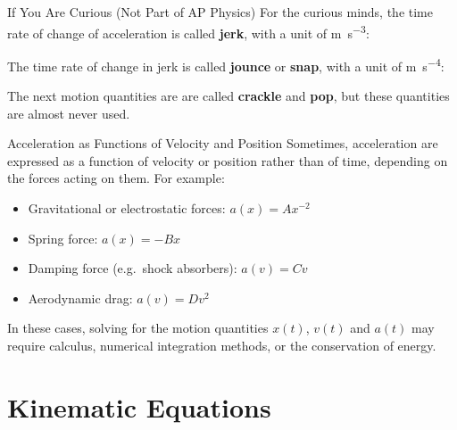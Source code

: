 \documentclass[12pt,compress,aspectratio=169]{beamer}
\newcommand{\mb}[1]{\ensuremath\mathbf{#1}}
\newcommand{\eq}[2]{\vspace{#1}{\Large\begin{displaymath}#2\end{displaymath}}}
\begin{document}
\begin{frame}{If You Are Curious (Not Part of AP Physics)}
  For the curious minds, the time rate of change of acceleration is called
  \textbf{jerk}, with a unit of \si{\metre\per\second^3}:

  \eq{-.25in}{
    \overline{\mb{j}}= \frac{\Delta\mb{a}}{\Delta t}
  }

  The time rate of change in jerk is called \textbf{jounce} or \textbf{snap},
  with a unit of \si{\metre\per\second^4}:
  
  \eq{-.1in}{
    \overline{\mb{s}}=\frac{\Delta\mb{j}}{\Delta t}
  }
  
  The next motion quantities are are called \textbf{crackle} and \textbf{pop},
  but these quantities are almost never used.\vspace{.3in}
\end{frame}



\begin{frame}{Acceleration as Functions of Velocity and Position}
  Sometimes, acceleration are expressed as a function of velocity or position
  rather than of time, depending on the forces acting on them. For example:
  \begin{itemize}
  \item Gravitational or electrostatic forces: $a(x)=Ax^{-2}$
  \item Spring force: $\displaystyle a(x)=-Bx$
  \item Damping force (e.g.\ shock absorbers): $a(v)=Cv$
  \item Aerodynamic drag: $a(v)=Dv^2$
  \end{itemize}
  In these cases, solving for the motion quantities $x(t)$, $v(t)$ and $a(t)$
  may require calculus, numerical integration methods, or the conservation of
  energy.
\end{frame}



\section{Kinematic Equations}
\end{document}
